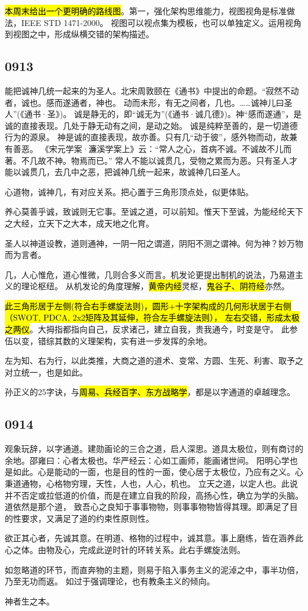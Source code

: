 \hl{本周末给出一个更明确的路线图}。第一，强化架构思维能力，视图视角是标准做法，IEEE STD 1471-2000。
视图可以视点集为模板，也可以单独定义。运用视角到视图之中，形成纵横交错的架构描述。

\subsection{0913}

\begin{shadequote}

能把诚神几统一起来的为圣人。北宋周敦颐在《通书》中提出的命题。“寂然不动者，诚也。感而遂通者，神也。
动而未形，有无之间者，几也。……诚神儿曰圣人”(《通书·圣》)。
诚是静无的，即“诚无为”(《通书·诚几德》)。神“感而遂通”，是诚的直接表现。几处于静无动有之间，是动之始。
诚是纯粹至善的，是一切道德行为的源泉。
神是诚的直接表现，故亦善。只有几“动于彼”，感外物而动，故兼有善恶。
《宋元学案·濂溪学案上》云：“常人之心，首病不诚。不诚故不儿而著。不几故不神。物焉而已。”
常人不能以诚贯几，受物之累而为恶。只有圣人才能以诚贯几，去几中之恶，把诚神几统一起来，故诚神几曰圣人。
\end{shadequote}

心道物，诚神几，有对应关系。把心置于三角形顶点处，似更体贴。

养心莫善乎诚，致诚则无它事。至诚之道，可以前知。惟天下至诚，为能经纶天下之大经，立天下之大本，成天地之化育。

圣人以神道设教，道则通神，一阴一阳之谓道，阴阳不测之谓神。何为神？妙万物而为言者。

几，人心惟危，道心惟微，几则合多义而言。机发论更提出制机的说法，乃易道主义的理论枢纽。
从机发论的角度理解，\hl{黄帝内经}灵枢，\hl{鬼谷子、阴符经}亦然。

\hl{此三角形居于左侧(符合右手螺旋法则)，圆形+十字架构成的几何形状居于右侧（SWOT, PDCA, 2x2矩阵及其延伸，符合左手螺旋法则），
左右交错，形成太极之两仪}。大拇指都指向自己，反求诸己，建立自我，贵我通今，时变是守。
此参伍以变，错综其数的义理架构，实有进一步发挥的余地。

左为知、右为行，以此类推，大商之道的道术、变常、方圆、生死、利害、取予之对立统一，也是如此。

孙正义的25字诀，与\hl{周易、兵经百字、东方战略学}，都是以字通道的卓越理念。

\subsection{0914}

观象玩辞，以字通道。建勋画论的三合之道，启人深思。道具太极位，则有商讨的余地。邵雍曰：心者太极也。华严经云：心如工画师，能画诸世间。
阳明心学也是如此。心是能动的一面，也是目的性的一面，使心居于太极位，乃应有之义。心秉道通物，心格物穷理，天性，人也，人心，机也。
立天之道，以定人也。此说并不否定或拉低道的价值，而是在建立自我的阶段，高扬心性，确立为学的头脑。道依然是那个道，
致吾心之良知于事事物物，则事事物物皆得其理。即满足了目的性要求，又满足了道的约束性原则性。

欲正其心者，先诚其意。在明道、格物的过程中，诚其意。事上磨练，皆在涵养此心之体。由物及心，完成此逆时针的环转关系。此右手螺旋法则。

如忽略道的环节，而直奔物的主题，则易于陷入事务主义的泥淖之中，事半功倍，乃至无功而返。
如过于强调理论，也有教条主义的倾向。

神者生之本。
